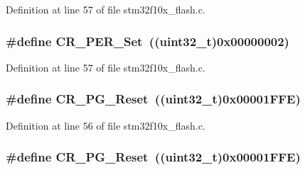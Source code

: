 Definition at line 57 of file stm32f10x\+\_\+flash.\+c.

\subsubsection[{\texorpdfstring{C\+R\+\_\+\+P\+E\+R\+\_\+\+Set}{CR_PER_Set}}]{\setlength{\rightskip}{0pt plus 5cm}\#define C\+R\+\_\+\+P\+E\+R\+\_\+\+Set~(({\bf uint32\+\_\+t})0x00000002)}\hypertarget{group___f_l_a_s_h___private___defines_ga6e5e45c62f559102546b40de50c700bd}{}\label{group___f_l_a_s_h___private___defines_ga6e5e45c62f559102546b40de50c700bd}


Definition at line 57 of file stm32f10x\+\_\+flash.\+c.

\subsubsection[{\texorpdfstring{C\+R\+\_\+\+P\+G\+\_\+\+Reset}{CR_PG_Reset}}]{\setlength{\rightskip}{0pt plus 5cm}\#define C\+R\+\_\+\+P\+G\+\_\+\+Reset~(({\bf uint32\+\_\+t})0x00001\+F\+F\+E)}\hypertarget{group___f_l_a_s_h___private___defines_gadda1a996e1867e911aaa7b0f30eb6834}{}\label{group___f_l_a_s_h___private___defines_gadda1a996e1867e911aaa7b0f30eb6834}


Definition at line 56 of file stm32f10x\+\_\+flash.\+c.

\subsubsection[{\texorpdfstring{C\+R\+\_\+\+P\+G\+\_\+\+Reset}{CR_PG_Reset}}]{\setlength{\rightskip}{0pt plus 5cm}\#define C\+R\+\_\+\+P\+G\+\_\+\+Reset~(({\bf uint32\+\_\+t})0x00001\+F\+F\+E)}\hypertarget{group___f_l_a_s_h___private___defines_gadda1a996e1867e911aaa7b0f30eb6834}{}\label{group___f_l_a_s_h___private___defines_gadda1a996e1867e911aaa7b0f30eb6834}


